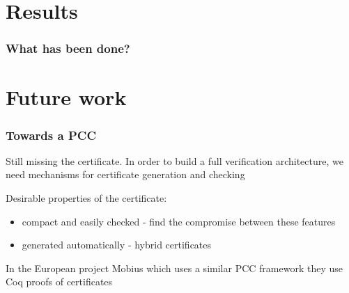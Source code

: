 \documentclass{beamer}
\begin{document}
 
\section{Results}

\begin{frame}[shrink]\frametitle{What has been done?}
\begin{center}
\end{center}
\end{frame}


 \section{Future work}

\begin{frame}[shrink]\frametitle{Towards  a PCC }
  Still missing the certificate. 
In order to build a full verification architecture,  we need mechanisms for certificate generation and checking

Desirable properties of the certificate:
                    \begin{itemize}
	                \item    compact and  easily checked - find the compromise between these features  
			  \item  generated automatically - hybrid certificates
		    \end{itemize}

In the European project Mobius which uses a similar PCC framework they 
			      use Coq proofs of certificates
		    

\begin{center}
\end{center}
\end{frame}
\end{document}
